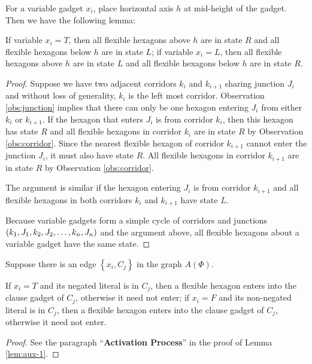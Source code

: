 For a variable gadget $x_i$, place horizontal axis $h$ at mid-height of the gadget.
Then we have the following lemma:
\begin{lem}\label{lem:aux-2}
If variable $x_i = T$, then all flexible hexagons above $h$ are in state $R$ and all flexible hexagons below $h$ are in state $L$; if variable $x_i = L$, then all flexible hexagons above $h$ are in state $L$ and all flexible hexagons below $h$ are in state $R$.    
\end{lem}
\begin{proof}
Suppose we have two adjacent corridors $k_i$ and $k_{i+1}$ sharing junction $J_i$ and without loss of generality, $k_i$ is the left most corridor.
Observation \ref{obs:junction} implies that there can only be one hexagon entering $J_i$ from either $k_i$ or $k_{i+1}$. If the hexagon that enters $J_i$ is from corridor $k_i$, then this hexagon has state $R$ and all flexible hexagons in corridor $k_i$ are in state $R$ by Observation \ref{obs:corridor}. 
Since the nearest flexible hexagon of corridor $k_{i+1}$ cannot enter the junction $J_i$, it must also have state $R$.  
All flexible hexagons in corridor $k_{i+1}$ are in state $R$ by Observation \ref{obs:corridor}. 

The argument is similar if the hexagon entering $J_i$ is from corridor $k_{i+1}$ and all flexible hexagons in both corridors $k_i$ and $k_{i+1}$ have state $L$.

Because variable gadgets form a simple cycle of corridors and junctions $\left( k_1, J_1, k_2, J_2, \dots, k_n, J_n \right)$ and the argument above, all flexible hexagons about a variable gadget have the same state.
\end{proof}
Suppose there is an edge $\left\lbrace x_i, C_j \right\rbrace$ in the graph $A(\Phi)$.
\begin{lem}\label{lem:aux-3}
If $x_i = T$ and its negated literal is in $C_j$, then a flexible hexagon enters into the clause gadget of $C_j$, otherwise it need not enter; if $x_i = F$ and its non-negated literal is in $C_j$, then a flexible hexagon enters into the clause gadget of $C_j$, otherwise it need not enter.
\end{lem}
\begin{proof}
See the paragraph ``\textbf{Activation Process}'' in the proof of Lemma \ref{lem:aux-1}.
\end{proof}

